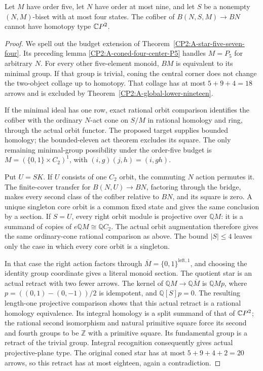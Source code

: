 \begin{proposition}
\label{CP2:A-five-center-nine-four}
Let $M$ have order five, let $N$ have order at most nine, and let
$S$ be a nonempty $(N,M)$-biset with at most four states. The
cofiber of $B(N,S,M)\longrightarrow BN$ cannot have homotopy
type $\mathbb{C}P^2$.
\end{proposition}
\begin{proof}
We spell out the budget extension of
Theorem~\ref{CP2:A-star-five-seven-four}. Its preceding lemma
\ref{CP2:A-coned-four-center-P5} handles $M=P_5$ for arbitrary
$N$. For every other five-element monoid, $BM$ is equivalent to
its minimal group. If that group is trivial, coning the central
corner does not change the two-object collage up to homotopy.
That collage has at most $5+9+4=18$ arrows and is excluded by
Theorem~\ref{CP2:A-global-lower-nineteen}.

If the minimal ideal has one row, exact rational orbit comparison
identifies the cofiber with the ordinary $N$-act cone on $S/M$ in
rational homology and ring, through the actual orbit functor.
The proposed target supplies bounded homology; the bounded-eleven
act theorem excludes its square. The only remaining minimal-group
possibility under the order-five budget is
$M=(\{0,1\}\times C_2)^1$, with
$(i,g)(j,h)=(i,gh)$.

Put $U=SK$. If $U$ consists of one $C_2$ orbit, the commuting
$N$ action permutes it. The finite-cover transfer for
$B(N,U)\to BN$, factoring through the bridge, makes every
second class of the cofiber relative to $BN$, and its square is
zero. A unique singleton core orbit is a common fixed state and
gives the same conclusion by a section. If $S=U$, every right
orbit module is projective over $\mathbb QM$: it is a summand
of copies of $e\mathbb QM\cong\mathbb QC_2$. The actual orbit
augmentation therefore gives the same ordinary-cone rational
comparison as above. The bound $|S|\le4$ leaves only the case
in which every core orbit is a singleton.

In that case the right action factors through
$\overline M=\{0,1\}^{\mathrm{left},1}$, and choosing the
identity group coordinate gives a literal monoid section. The
quotient star is an actual retract with two fewer arrows. The
kernel of $\mathbb QM\to\mathbb Q\overline M$ is
$\mathbb QM p$, where
$p=((0,1)-(0,-1))/2$ is idempotent, and $\mathbb Q[S]p=0$.
The resulting length-one projective comparison shows that this
actual retract is a rational homology equivalence. Its integral
homology is a split summand of that of $\mathbb{C}P^2$; the rational
second isomorphism and natural primitive square force its second
and fourth groups to be $\mathbb Z$ with a primitive square.
Its fundamental group is a retract of the trivial group. Integral
recognition consequently gives actual projective-plane type.
The original coned star has at most $5+9+4+2=20$ arrows, so this
retract has at most eighteen, again a contradiction.
\end{proof}

